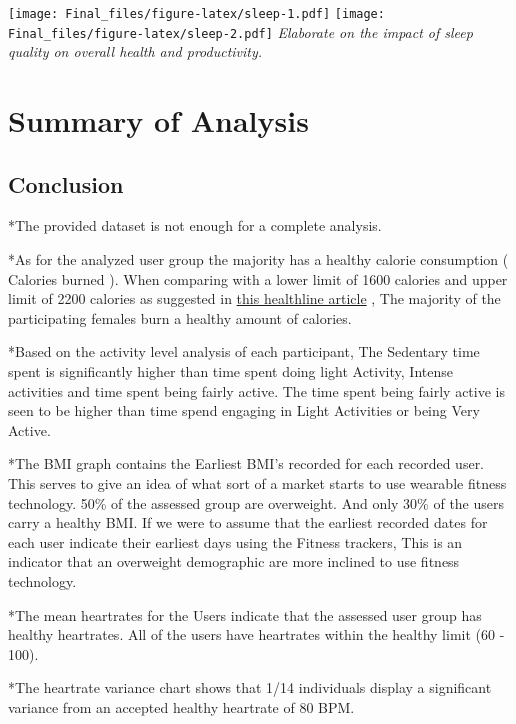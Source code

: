 \documentclass[
]{article}
\begin{document}
\texttt{[image: Final\_files/figure-latex/sleep-1.pdf]}
\texttt{[image: Final\_files/figure-latex/sleep-2.pdf]} \emph{Elaborate
on the impact of sleep quality on overall health and productivity.}

\hypertarget{summary-of-analysis}{%
\section{Summary of Analysis}\label{summary-of-analysis}}

\hypertarget{conclusion}{%
\subsection{Conclusion}\label{conclusion}}

*The provided dataset is not enough for a complete analysis.

*As for the analyzed user group the majority has a healthy calorie
consumption ( Calories burned ). When comparing with a lower limit of
1600 calories and upper limit of 2200 calories as suggested in
\href{https://www.healthline.com/health/fitness-exercise/how-many-calories-do-i-burn-a-day\#:~:text=You\%20burn\%20calories\%20daily\%20when,your\%20body\%20and\%20activity\%20levels.}{this
healthline article} , The majority of the participating females burn a
healthy amount of calories.

*Based on the activity level analysis of each participant, The Sedentary
time spent is significantly higher than time spent doing light Activity,
Intense activities and time spent being fairly active. The time spent
being fairly active is seen to be higher than time spend engaging in
Light Activities or being Very Active.

*The BMI graph contains the Earliest BMI's recorded for each recorded
user. This serves to give an idea of what sort of a market starts to use
wearable fitness technology. 50\% of the assessed group are overweight.
And only 30\% of the users carry a healthy BMI. If we were to assume
that the earliest recorded dates for each user indicate their earliest
days using the Fitness trackers, This is an indicator that an overweight
demographic are more inclined to use fitness technology.

*The mean heartrates for the Users indicate that the assessed user group
has healthy heartrates. All of the users have heartrates within the
healthy limit (60 - 100).

*The heartrate variance chart shows that 1/14 individuals display a
significant variance from an accepted healthy heartrate of 80 BPM.
\end{document}
